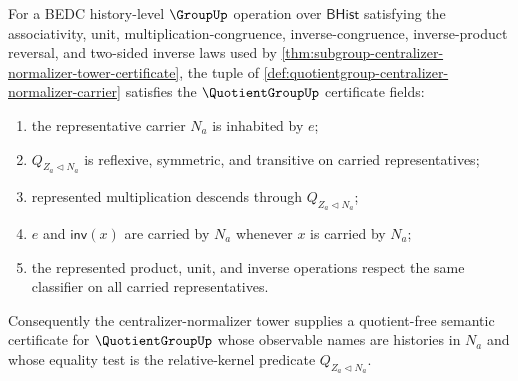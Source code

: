 \begin{theorem}
\label{thm:quotientgroup-centralizer-normalizer-semantic-certificate}
For a BEDC history-level $\GroupUp$ operation over $\mathsf{BHist}$
satisfying the associativity, unit, multiplication-congruence,
inverse-congruence, inverse-product reversal, and two-sided inverse laws used
by \autoref{thm:subgroup-centralizer-normalizer-tower-certificate}, the tuple
of \autoref{def:quotientgroup-centralizer-normalizer-carrier} satisfies the
$\QuotientGroupUp$ certificate fields:
\begin{enumerate}
\item the representative carrier $N_a$ is inhabited by $e$;
\item $Q_{Z_a\triangleleft N_a}$ is reflexive, symmetric, and transitive on
carried representatives;
\item represented multiplication descends through
$Q_{Z_a\triangleleft N_a}$;
\item $e$ and $\mathsf{inv}(x)$ are carried by $N_a$ whenever $x$ is carried
by $N_a$;
\item the represented product, unit, and inverse operations respect the same
classifier on all carried representatives.
\end{enumerate}
Consequently the centralizer-normalizer tower supplies a quotient-free
semantic certificate for $\QuotientGroupUp$ whose observable names are
histories in $N_a$ and whose equality test is the relative-kernel predicate
$Q_{Z_a\triangleleft N_a}$.
\end{theorem}

